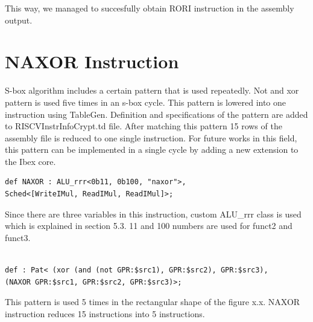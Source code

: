 This way, we managed to succesfully obtain RORI instruction in the assembly output.

\section{NAXOR Instruction}

S-box algorithm includes a certain pattern that is used repeatedly. Not and xor pattern is used five times in an s-box cycle. This pattern is lowered into one instruction using TableGen. Definition and specifications of the pattern are added to RISCVInstrInfoCrypt.td file. After matching this pattern 15 rows of the assembly file is reduced to one single instruction. For future works in this field, this pattern can be implemented in a single cycle by adding a new extension to the Ibex core.  

\begin{lstlisting}
def NAXOR : ALU_rrr<0b11, 0b100, "naxor">,
Sched<[WriteIMul, ReadIMul, ReadIMul]>;
\end{lstlisting}

Since there are three variables in this instruction, custom ALU\_rrr class is used which is explained in section 5.3. 11 and 100 numbers are used for funct2 and funct3.
\\\\
\begin{lstlisting}
def : Pat< (xor (and (not GPR:$src1), GPR:$src2), GPR:$src3),
(NAXOR GPR:$src1, GPR:$src2, GPR:$src3)>;
\end{lstlisting}

This pattern is used 5 times in the rectangular shape of the figure x.x. NAXOR instruction reduces 15 instructions into 5 instructions.
\\\\
%
%

